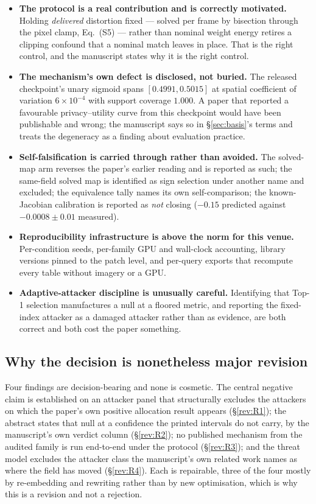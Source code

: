 \documentclass[11pt,a4paper]{article}
\begin{document}
\begin{itemize}
\item \textbf{The protocol is a real contribution and is correctly
  motivated.} Holding \emph{delivered} distortion fixed --- solved per frame by
  bisection through the pixel clamp, Eq.~(S5) --- rather than nominal weight
  energy retires a clipping confound that a nominal match leaves in place. That
  is the right control, and the manuscript states why it is the right control.
\item \textbf{The mechanism's own defect is disclosed, not buried.} The
  released checkpoint's unary sigmoid spans $[0.4991,0.5015]$ at spatial
  coefficient of variation $6\times10^{-4}$ with support coverage $1.000$. A
  paper that reported a favourable privacy--utility curve from this checkpoint
  would have been publishable and wrong; the manuscript says so in
  \S\ref{sec:basis}'s terms and treats the degeneracy as a finding about
  evaluation practice.
\item \textbf{Self-falsification is carried through rather than avoided.} The
  solved-map arm reverses the paper's earlier reading and is reported as such;
  the same-field solved map is identified as sign selection under another name
  and excluded; the equivalence tally names its own self-comparison; the
  known-Jacobian calibration is reported as \emph{not} closing
  ($-0.15$ predicted against $-0.0008\pm0.01$ measured).
\item \textbf{Reproducibility infrastructure is above the norm for this
  venue.} Per-condition seeds, per-family GPU and wall-clock accounting,
  library versions pinned to the patch level, and per-query exports that
  recompute every table without imagery or a GPU.
\item \textbf{Adaptive-attacker discipline is unusually careful.} Identifying
  that Top-1 selection manufactures a null at a floored metric, and reporting
  the fixed-index attacker as a damaged attacker rather than as evidence, are
  both correct and both cost the paper something.
\end{itemize}

\subsection*{Why the decision is nonetheless major revision}

Four findings are decision-bearing and none is cosmetic. The central negative
claim is established on an attacker panel that structurally excludes the
attackers on which the paper's own positive allocation result appears
(\S\ref{rev:R1}); the abstract states that null at a confidence the printed
intervals do not carry, by the manuscript's own verdict column
(\S\ref{rev:R2}); no published mechanism from the audited family is run
end-to-end under the protocol (\S\ref{rev:R3}); and the threat model excludes
the attacker class the manuscript's own related work names as where the field
has moved (\S\ref{rev:R4}). Each is repairable, three of the four mostly by
re-embedding and rewriting rather than by new optimisation, which is why this
is a revision and not a rejection.
\end{document}
